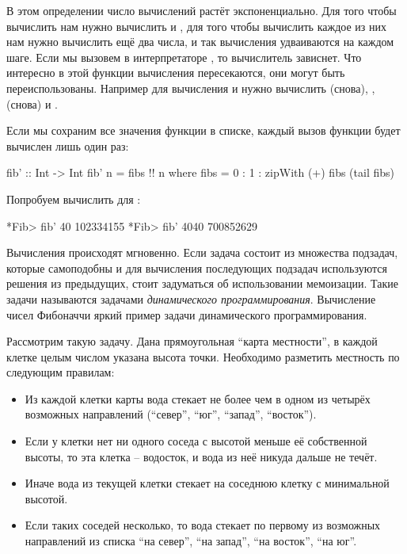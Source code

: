 В этом определении число вычислений растёт экспоненциально. Для того
чтобы вычислить  нам нужно вычислить  и
, для того чтобы вычислить каждое из них нам нужно
вычислить ещё два числа, и так вычисления удваиваются на каждом шаге.
Если мы вызовем в интерпретаторе , то вычислитель зависнет.
Что интересно в этой функции вычисления пересекаются, они могут быть
переиспользованы. Например для вычисления  и
 нужно вычислить  (снова), ,
 (снова) и .

Если мы сохраним все значения функции в списке, каждый вызов функции
будет вычислен лишь один раз:


\begin{code}
fib' :: Int -> Int
fib' n = fibs !! n
    where fibs = 0 : 1 : zipWith (+) fibs (tail fibs)
\end{code}

Попробуем вычислить для :


\begin{code}
*Fib> fib' 40
102334155
*Fib> fib' 4040
700852629
\end{code}

Вычисления происходят мгновенно. Если задача состоит из множества
подзадач, которые самоподобны и для вычисления последующих подзадач
используются решения из предыдущих, стоит задуматься об использовании
мемоизации. Такие задачи называются задачами \emph{динамического
программирования}. Вычисление чисел Фибоначчи яркий пример задачи
динамического программирования.

Рассмотрим такую задачу. Дана прямоугольная ``карта местности'', в
каждой клетке целым числом указана высота точки. Необходимо разметить
местность по следующим правилам:

\begin{itemize}
\item
  Из каждой клетки карты вода стекает не более чем в одном из четырёх
  возможных направлений (``север'', ``юг'', ``запад'', ``восток'').
\item
  Если у клетки нет ни одного соседа с высотой меньше её собственной
  высоты, то эта клетка -- водосток, и вода из неё никуда дальше не
  течёт.
\item
  Иначе вода из текущей клетки стекает на соседнюю клетку с минимальной
  высотой.
\item
  Если таких соседей несколько, то вода стекает по первому из возможных
  направлений из списка ``на север'', ``на запад'', ``на восток'', ``на
  юг''.
\end{itemize}

